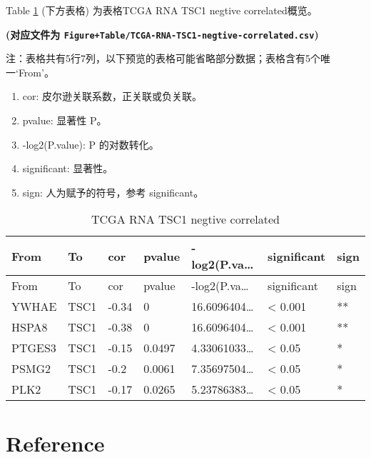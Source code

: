 \documentclass[
]{article}
\providecommand{\tightlist}{%
  \setlength{\itemsep}{0pt}\setlength{\parskip}{0pt}}
\begin{document}
Table \ref{tab:TCGA-RNA-TSC1-negtive-correlated} (下方表格) 为表格TCGA RNA TSC1 negtive correlated概览。

\textbf{(对应文件为 \texttt{Figure+Table/TCGA-RNA-TSC1-negtive-correlated.csv})}

\begin{center}\begin{tcolorbox}[colback=gray!10, colframe=gray!50, width=0.9\linewidth, arc=1mm, boxrule=0.5pt]注：表格共有5行7列，以下预览的表格可能省略部分数据；表格含有5个唯一`From'。
\end{tcolorbox}
\end{center}
\begin{center}\begin{tcolorbox}[colback=gray!10, colframe=gray!50, width=0.9\linewidth, arc=1mm, boxrule=0.5pt]\begin{enumerate}\tightlist
\item cor:  皮尔逊关联系数，正关联或负关联。
\item pvalue:  显著性 P。
\item -log2(P.value):  P 的对数转化。
\item significant:  显著性。
\item sign:  人为赋予的符号，参考 significant。
\end{enumerate}\end{tcolorbox}
\end{center}

\begin{longtable}[]{@{}lllllll@{}}
\caption{\label{tab:TCGA-RNA-TSC1-negtive-correlated}TCGA RNA TSC1 negtive correlated}\tabularnewline
\toprule
From & To & cor & pvalue & -log2(P.va\ldots{} & significant & sign\tabularnewline
\midrule
\endfirsthead
\toprule
From & To & cor & pvalue & -log2(P.va\ldots{} & significant & sign\tabularnewline
\midrule
\endhead
YWHAE & TSC1 & -0.34 & 0 & 16.6096404\ldots{} & \textless{} 0.001 & **\tabularnewline
HSPA8 & TSC1 & -0.38 & 0 & 16.6096404\ldots{} & \textless{} 0.001 & **\tabularnewline
PTGES3 & TSC1 & -0.15 & 0.0497 & 4.33061033\ldots{} & \textless{} 0.05 & *\tabularnewline
PSMG2 & TSC1 & -0.2 & 0.0061 & 7.35697504\ldots{} & \textless{} 0.05 & *\tabularnewline
PLK2 & TSC1 & -0.17 & 0.0265 & 5.23786383\ldots{} & \textless{} 0.05 & *\tabularnewline
\bottomrule
\end{longtable}

\hypertarget{bibliography}{%
\section*{Reference}\label{bibliography}}
\end{document}
